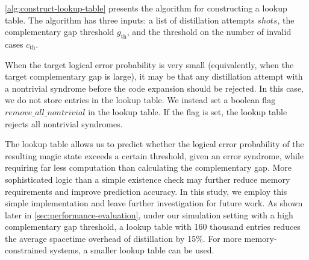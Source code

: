 \autoref{alg:construct-lookup-table} presents the algorithm for constructing a lookup table.
The algorithm has three inputs: a list of distillation attempts $shots$, the complementary gap threshold $g_\mathrm{th}$, and the threshold on the number of invalid cases $c_\mathrm{th}$.

When the target logical error probability is very small (equivalently, when the target complementary gap is large), it may be that any distillation attempt with a nontrivial syndrome before the code expansion should be rejected.
In this case, we do not store entries in the lookup table.
We instead set a boolean flag $remove\_all\_nontrivial$ in the lookup table.
If the flag is set, the lookup table rejects all nontrivial syndromes.

The lookup table allows us to predict whether the logical error probability of the resulting magic state exceeds a certain threshold, given an error syndrome, while requiring far less computation than calculating the complementary gap.
More sophisticated logic than a simple existence check may further reduce memory requirements and improve prediction accuracy.
In this study, we employ this simple implementation and leave further investigation for future work.
As shown later in \autoref{sec:performance-evaluation}, under our simulation setting with a high complementary gap threshold, a lookup table with 160 thousand entries reduces the average spacetime overhead of distillation by 15\%.
For more memory-constrained systems, a smaller lookup table can be used.
